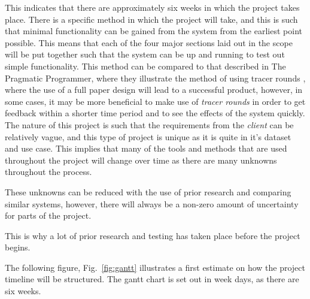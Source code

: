\documentclass[12pt,onecolumn]{IEEEtran}
\begin{document}
This indicates that there are approximately six weeks in which the project takes place. 
There is a specific method in which the project will take, and this is such that minimal functionality can be gained from the system from the earliest point possible. 
This means that each of the four major sections laid out in the scope will be put together such that the system can be up and running to test out simple functionality. 
This method can be compared to that described in The Pragmatic Programmer, where they illustrate the method of using tracer rounds \cite{pragmatic}, where the use of a full paper design will lead to a successful product, however, in some cases, it may be more beneficial to make use of \textit{tracer rounds} in order to get feedback within a shorter time period and to see the effects of the system quickly.
The nature of this project is such that the requirements from the \textit{client} can be relatively vague, and this type of project is unique as it is quite in it's dataset and use case. 
This implies that many of the tools and methods that are used throughout the project will change over time as there are many unknowns throughout the process. 

These unknowns can be reduced with the use of prior research and comparing similar systems, however, there will always be a non-zero amount of uncertainty for parts of the project.

This is why a lot of prior research and testing has taken place before the project begins. 

The following figure, Fig.~\ref{fig:gantt} illustrates a first estimate on how the project timeline will be structured. The gantt chart is set out in week days, as there are six weeks.  
\end{document}
